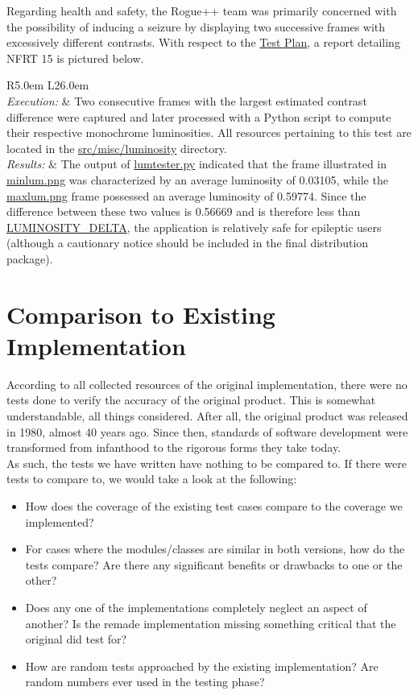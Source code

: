 \documentclass[12pt, titlepage]{article}
\newcommand{\newsection}[1]{\newpage\section{#1}}
\newcommand{\nfrtc}[3]{
	\begin{table}[H]
		\centering
		\def\arraystretch{1.6}
		\begin{tabular}{ R{5.0em} L{26.0em} }
			\bottomrule
			\multicolumn{2}{ c }{\textbf{Non-Functional Requirement Test} \# #1 \textbf{Report}}  \\
			\hline
			\textit{Execution:} & #2 \\
			\textit{Results:} & #3 \\
			\toprule
		\end{tabular}
	\end{table}
}
\newcommand{\tplink}[1]{\href{run:../TestPlan/TestPlan.pdf}{#1}}
\begin{document}
		Regarding health and safety, the Rogue++ team was primarily concerned with the possibility of inducing a seizure by displaying two successive frames with excessively different contrasts.  With respect to the \href{run:../TestPlan/TestPlan.pdf}{Test Plan}, a report detailing NFRT 15 is pictured below.

	\nfrtc {15}
			{Two consecutive frames with the largest estimated contrast difference were captured and later processed with a Python script to compute their respective monochrome luminosities.  All resources pertaining to this test are located in the \href{run:../../src/misc/luminosity}{src/misc/luminosity} directory.}
			{The output of \href{run:../../src/misc/luminosity/lumtester.py}{lumtester.py} indicated that the frame illustrated in \href{run:../../src/misc/luminosity/minlum.png}{minlum.png} was characterized by an average luminosity of 0.03105, while the \href{run:../../src/misc/luminosity/maxlum.png}{maxlum.png} frame possessed an average luminosity of 0.59774.  Since the difference between these two values is 0.56669 and is therefore less than \tplink{LUMINOSITY\_DELTA}, the application is relatively safe for epileptic users (although a cautionary notice should be included in the final distribution package).}

\newsection{Comparison to Existing Implementation} \label{Section_Comparison}

	According to all collected resources of the original implementation, there were no tests done to verify the accuracy of the original product. This is somewhat understandable, all things considered. After all, the original product was released in 1980, almost 40 years ago. Since then, standards of software development were transformed from infanthood to the rigorous forms they take today.\\

	As such, the tests we have written have nothing to be compared to. If there were tests to compare to, we would take a look at the following:\\

	\begin{itemize}
		\item How does the coverage of the existing test cases compare to the coverage we implemented?
		\item For cases where the modules/classes are similar in both versions, how do the tests compare? Are there any significant benefits or drawbacks to one or the other?
		\item Does any one of the implementations completely neglect an aspect of another? Is the remade implementation missing something critical that the original did test for?
		\item How are random tests approached by the existing implementation? Are random numbers ever used in the testing phase?
	\end{itemize}
\end{document}
